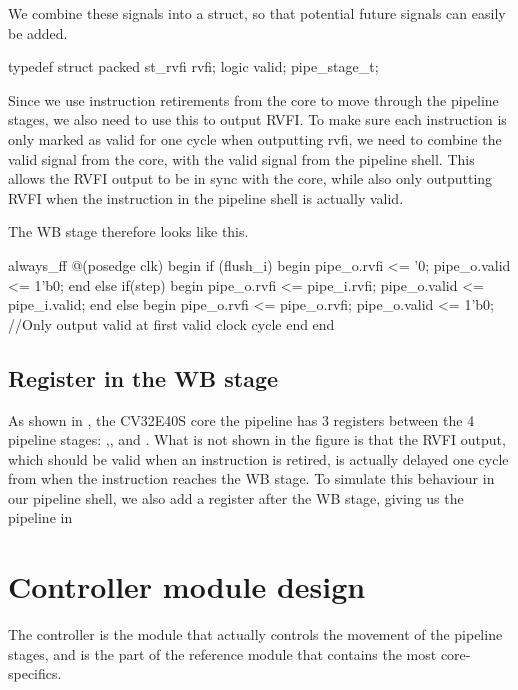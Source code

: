 We combine these signals into a struct, so that potential future signals can easily be added.
\begin{systemverilog}
typedef struct packed {
    st_rvfi rvfi;
    logic valid;
} pipe_stage_t; 
\end{systemverilog}


Since we use instruction retirements from the core to move through the pipeline stages, we also need to use this to output RVFI. To make sure each instruction is only marked as valid for one cycle when outputting rvfi, we need to combine the valid signal from the core, with the valid signal from the pipeline shell. This allows the RVFI output to be in sync with the core, while also only outputting RVFI when the instruction in the pipeline shell is actually valid.

The WB stage therefore looks like this.
\begin{systemverilog}
always_ff @(posedge clk) begin
    if (flush_i) begin
        pipe_o.rvfi <= '0;
        pipe_o.valid <= 1'b0;
    end else if(step) begin
        pipe_o.rvfi <= pipe_i.rvfi;
        pipe_o.valid <= pipe_i.valid;
    end
    else begin
        pipe_o.rvfi <= pipe_o.rvfi;
        pipe_o.valid <= 1'b0; //Only output valid at first valid clock cycle
    end
end
\end{systemverilog}

\subsection{Register in the WB stage}

As shown in , the CV32E40S core the pipeline has 3 registers between the 4 pipeline stages: ,, and . What is not shown in the figure is that the RVFI output, which should be valid when an instruction is retired, is actually delayed one cycle from when the instruction reaches the WB stage. To simulate this behaviour in our pipeline shell, we also add a register after the WB stage, giving us the pipeline in 

\section{Controller module design}

The controller is the module that actually controls the movement of the pipeline stages, and is the part of the reference module that contains the most core-specifics.

